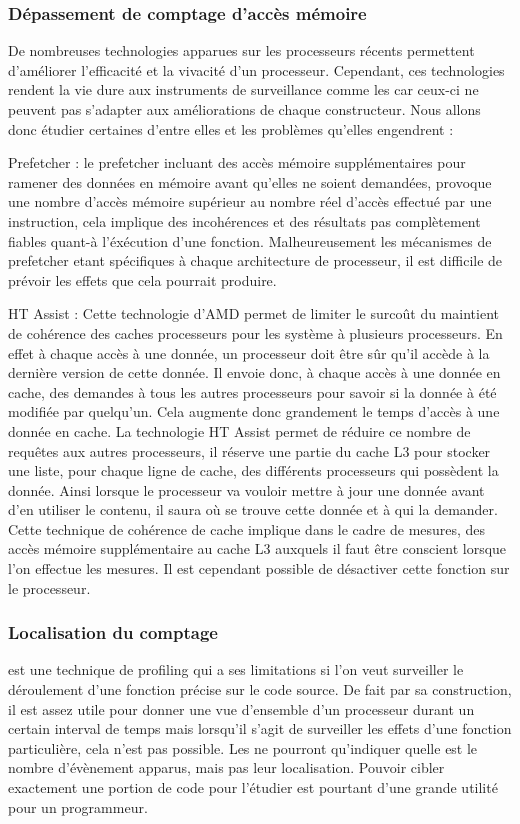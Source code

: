 					\subsubsection{Dépassement de comptage d'accès mémoire}
						De nombreuses technologies apparues sur les processeurs récents permettent d'améliorer l'efficacité et la vivacité d'un processeur. Cependant, ces technologies rendent la vie dure aux instruments de surveillance comme les \PMC car ceux-ci ne peuvent pas s'adapter aux améliorations de chaque constructeur. Nous allons donc étudier certaines d'entre elles et les problèmes qu'elles engendrent : 
						\bitem
							\item{Prefetcher : le prefetcher incluant des accès mémoire supplémentaires pour ramener des données en mémoire avant qu'elles ne soient demandées, provoque une nombre d'accès mémoire supérieur au nombre réel d'accès effectué par une instruction, cela implique des incohérences et des résultats pas complètement fiables quant-à l'éxécution d'une fonction. Malheureusement les mécanismes de prefetcher etant spécifiques à chaque architecture de processeur, il est difficile de prévoir les effets que cela pourrait produire.}
							\item{HT Assist : Cette technologie d'AMD permet de limiter le surcoût du maintient de cohérence des caches processeurs pour les système à plusieurs processeurs. En effet à chaque accès à une donnée, un processeur doit être sûr qu'il accède à la dernière version de cette donnée. Il envoie donc, à chaque accès à une donnée en cache, des demandes à tous les autres processeurs pour savoir si la donnée à été modifiée par quelqu'un. Cela augmente donc grandement le temps d'accès à une donnée en cache. La technologie HT Assist permet de réduire ce nombre de requêtes aux autres processeurs, il réserve une partie du cache L3 pour stocker une liste, pour chaque ligne de cache, des différents processeurs qui possèdent la donnée. Ainsi lorsque le processeur va vouloir mettre à jour une donnée avant d'en utiliser le contenu, il saura où se trouve cette donnée et à qui la demander. Cette technique de cohérence de cache implique dans le cadre de mesures, des accès mémoire supplémentaire au cache L3 auxquels il faut être conscient lorsque l'on effectue les mesures. Il est cependant possible de désactiver cette fonction sur le processeur.} 
						\eitem
					\subsubsection{Localisation du comptage}
						\PMC est une technique de profiling qui a ses limitations si l'on veut surveiller le déroulement d'une fonction précise sur le code source. De fait par sa construction, il est assez utile pour donner une vue d'ensemble d'un processeur durant un certain interval de temps mais lorsqu'il s'agit de surveiller les effets d'une fonction particulière, cela n'est pas possible. Les \PMC ne pourront qu'indiquer quelle est le nombre d'évènement apparus, mais pas leur localisation. Pouvoir cibler exactement une portion de code pour l'étudier est pourtant d'une grande utilité pour un programmeur.
